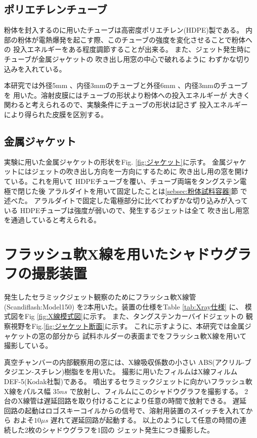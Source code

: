 \subsection{ポリエチレンチューブ}

粉体を封入するのに用いたチューブは高密度ポリエチレン(HDPE)製である。
内部の粉体が電熱爆発を起こす際、このチューブの強度を変化させることで粉体への
投入エネルギーをある程度調節することが出来る。
また、ジェット発生時にチューブが金属ジャケットの
吹き出し用窓の中心で破れるように
わずかな切り込みを入れている。

本研究では外径5mm 、内径3mmのチューブと外径6mm 、内径3mmのチューブを
用いた。溶射皮膜にはチューブの形状より粉体への投入エネルギーが
大きく関わると考えられるので、実験条件にチューブの形状は記さず
投入エネルギーにより得られた皮膜を区別する。

\subsection{金属ジャケット}

実験に用いた金属ジャケットの形状をFig. \ref{fig:ジャケット}に示す。
金属ジャケットにはジェットの吹き出し方向を一方向にするために
吹き出し用の窓を開けている。これを用いて
HDPEチューブを覆い、チューブ両端をタングステン電極で閉じた後
アラルダイトを用いて固定したことは\ref{sebsec:粉体試料容器}節
で述べた。
アラルダイトで固定した電極部分に比べてわずかな切り込みが入っている
HDPEチューブは強度が弱いので、発生するジェットは全て
吹き出し用窓を通過していると考えられる。


\section{フラッシュ軟X線を用いたシャドウグラフの撮影装置}

発生したセラミックジェット観察のためにフラッシュ軟X線管(Scandiflash:Model150)
を2本用いた。装置の仕様をTable \ref{tab:Xray仕様} に、
模式図をFig \ref{fig:X線模式図}に示す。
また、タングステンカーバイドジェットの
観察視野をFig.\ref{fig:ジャケット断面}に示す。
これに示すように、本研究では金属ジャケットの窓の部分から
試料ホルダーの表面までをフラッシュ軟X線を用いて撮影している。

真空チャンバーの内部観察用の窓には、X線吸収係数の小さい
ABS(アクリル-ブタジエン-スチレン)樹脂をを用いた。
撮影に用いたフィルムはX線フィルムDEF-5(Kodak社製)である。
噴出するセラミックジェットに向かいフラッシュ軟X線をパルス幅 $35ns$
で放射し、フィルムにこのシャドウグラフを撮影する。
2台のX線管は遅延回路を取り付けることにより任意の時間で放射できる。
遅延回路の起動はロゴスキーコイルからの信号で、溶射用装置のスイッチを入れてから
およそ$10 \mu s$ 遅れて遅延回路が起動する。
以上のようにして任意の時間の連続した2枚のシャドウグラフを1回の
ジェット発生につき撮影した。

